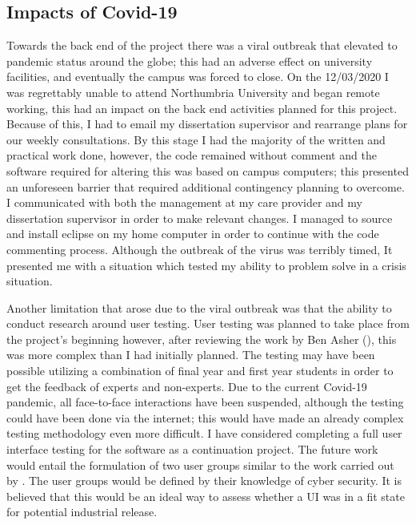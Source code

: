 \subsection{Impacts of Covid-19}

Towards the back end of the project there was a viral outbreak that elevated to pandemic status around the globe; this had an adverse effect on university facilities, and eventually the campus was forced to close. On the 12/03/2020 I was regrettably unable to attend Northumbria University and began remote working, this had an impact on the back end activities planned for this project. Because of this, I had to email my dissertation supervisor and rearrange plans for our weekly consultations. By this stage I had the majority of the written and practical work done, however, the code remained without comment and the software required for altering this was based on campus computers; this presented an unforeseen barrier that required additional contingency planning to overcome. I communicated with both the management at my care provider and my dissertation supervisor in order to make relevant changes. I managed to source and install eclipse on my home computer in order to continue with the code commenting process. Although the outbreak of the virus was terribly timed, It presented me with a situation which tested my ability to problem solve in a crisis situation. 


Another limitation that arose due to the viral outbreak was that the ability to conduct research around user testing. User testing was planned to take place from the project's beginning however, after reviewing the work by Ben Asher (\citeyear{ben2015effects}), this was more complex than I had initially planned. The testing may have been possible utilizing a combination of final year and first year students in order to get the feedback of experts and non-experts. Due to the current Covid-19 pandemic, all face-to-face interactions have been suspended, although the testing could have been done via the internet; this would have made an already complex testing methodology even more difficult. I have considered completing a full user interface testing for the software as a continuation project. The future work would entail the formulation of two user groups similar to the work carried out by \citeauthor{ben2015effects}. The user groups would be defined by their knowledge of cyber security. It is believed that this would be an ideal way to assess whether a UI was in a fit state for potential industrial release. 






 


